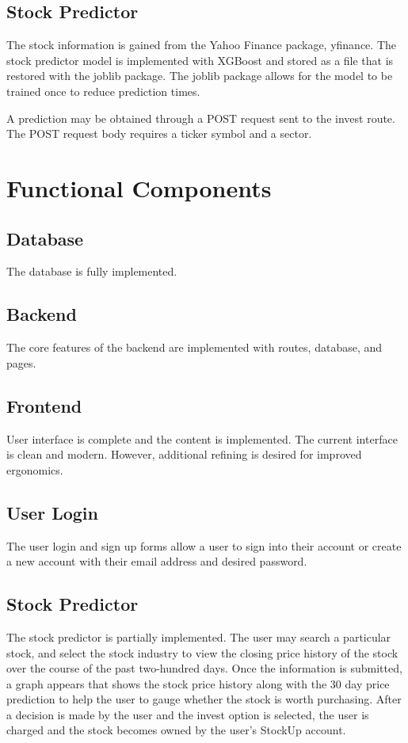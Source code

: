 \documentclass[11pt]{article}
\begin{document}
    \subsection{Stock Predictor}
    The stock information is gained from the Yahoo Finance package, yfinance.
    The stock predictor model is implemented with XGBoost and stored as a file that is restored with the joblib package.
    The joblib package allows for the model to be trained once to reduce prediction times.

    A prediction may be obtained through a POST request sent to the invest route.
    The POST request body requires a ticker symbol and a sector.

\section{Functional Components}
    \subsection{Database}
    The database is fully implemented.

    \subsection{Backend}
    The core features of the backend are implemented with routes, database, and pages.

    \subsection{Frontend}
    User interface is complete and the content is implemented.
    The current interface is clean and modern.
    However, additional refining is desired for improved ergonomics.
    
    \subsection{User Login}
    The user login and sign up forms allow a user to sign into their account or create a new account with their
    email address and desired password.

    \subsection{Stock Predictor}
    The stock predictor is partially implemented.
    The user may search a particular stock, and select the stock industry to view 
    the closing price history of the stock over the course of the past two-hundred days.
    Once the information is submitted, a graph appears that shows the stock price history along
    with the 30 day price prediction to help the user to gauge whether the stock
    is worth purchasing.
    After a decision is made by the user and the invest option is selected, the user is charged
    and the stock becomes owned by the user's StockUp account.
\end{document}
